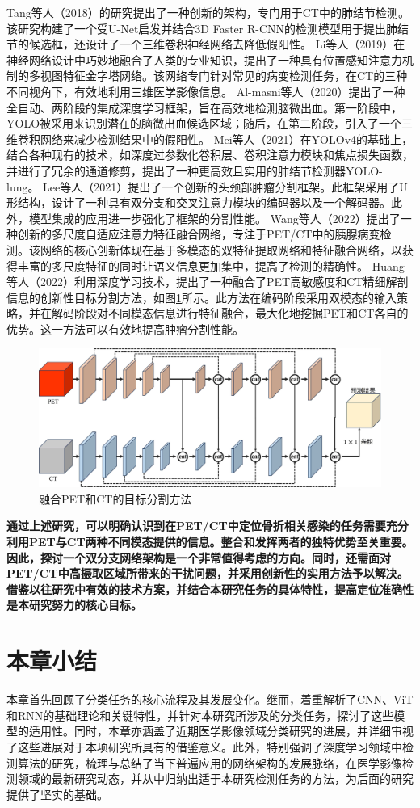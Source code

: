 Tang等人\cite{tang2018automated}（2018）的研究提出了一种创新的架构，专门用于CT中的肺结节检测。该研究构建了一个受U-Net启发并结合3D Faster R-CNN的检测模型用于提出肺结节的候选框，还设计了一个三维卷积神经网络去降低假阳性。
Li等人\cite{li2019mvp}（2019）在神经网络设计中巧妙地融合了人类的专业知识，提出了一种具有位置感知注意力机制的多视图特征金字塔网络。该网络专门针对常见的病变检测任务，在CT的三种不同视角下，有效地利用三维医学影像信息。
Al-masni等人\cite{al2020two}（2020）提出了一种全自动、两阶段的集成深度学习框架，旨在高效地检测脑微出血。第一阶段中，YOLO被采用来识别潜在的脑微出血候选区域；随后，在第二阶段，引入了一个三维卷积网络来减少检测结果中的假阳性。
Mei等人\cite{mei2021yolo}（2021）在YOLOv4的基础上，结合各种现有的技术，如深度过参数化卷积层、卷积注意力模块和焦点损失函数，并进行了冗余的通道修剪，提出了一种更高效且实用的肺结节检测器YOLO-lung。
Lee等人\cite{lee2021dual}（2021）提出了一个创新的头颈部肿瘤分割框架。此框架采用了U形结构，设计了一种具有双分支和交叉注意力模块的编码器以及一个解码器。此外，模型集成的应用进一步强化了框架的分割性能。
Wang等人\cite{wang2022maff}（2022）提出了一种创新的多尺度自适应注意力特征融合网络，专注于PET/CT中的胰腺病变检测。该网络的核心创新体现在基于多模态的双特征提取网络和特征融合网络，以获得丰富的多尺度特征的同时让语义信息更加集中，提高了检测的精确性。
Huang等人\cite{huang2022isa}（2022）利用深度学习技术，提出了一种融合了PET高敏感度和CT精细解剖信息的创新性目标分割方法，如图\ref{fig:chap02_isanet}所示。此方法在编码阶段采用双模态的输入策略，并在解码阶段对不同模态信息进行特征融合，最大化地挖掘PET和CT各自的优势。这一方法可以有效地提高肿瘤分割性能。

\begin{figure}[htbp]
  \centering
  \includegraphics[width=\textwidth]{figures/chap02_isanet.jpg}
  \caption{融合PET和CT的目标分割方法}
  \label{fig:chap02_isanet}
\end{figure}

\textbf{通过上述研究，可以明确认识到在PET/CT中定位骨折相关感染的任务需要充分利用PET与CT两种不同模态提供的信息。整合和发挥两者的独特优势至关重要。因此，探讨一个双分支网络架构是一个非常值得考虑的方向。同时，还需面对PET/CT中高摄取区域所带来的干扰问题，并采用创新性的实用方法予以解决。借鉴以往研究中有效的技术方案，并结合本研究任务的具体特性，提高定位准确性是本研究努力的核心目标。}

\section{本章小结}

本章首先回顾了分类任务的核心流程及其发展变化。继而，着重解析了CNN、ViT和RNN的基础理论和关键特性，并针对本研究所涉及的分类任务，探讨了这些模型的适用性。同时，本章亦涵盖了近期医学影像领域分类研究的进展，并详细审视了这些进展对于本项研究所具有的借鉴意义。此外，特别强调了深度学习领域中检测算法的研究，梳理与总结了当下普遍应用的网络架构的发展脉络，在医学影像检测领域的最新研究动态，并从中归纳出适于本研究检测任务的方法，为后面的研究提供了坚实的基础。